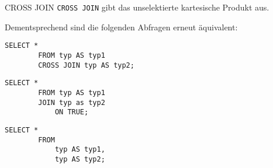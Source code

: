 \begin{sql}{CROSS JOIN}
    \texttt{CROSS JOIN} gibt das unselektierte kartesische Produkt aus.

    Dementsprechend sind die folgenden Abfragen erneut äquivalent:

    \begin{lstlisting}[language=mysql]
        SELECT *
        FROM typ AS typ1
        CROSS JOIN typ AS typ2;
    \end{lstlisting}
        
    \begin{lstlisting}[language=mysql]
        SELECT *
        FROM typ AS typ1
        JOIN typ as typ2
            ON TRUE;
    \end{lstlisting}
    
    \begin{lstlisting}[language=mysql]
        SELECT *
        FROM
            typ AS typ1,
            typ AS typ2;
    \end{lstlisting}
\end{sql}


